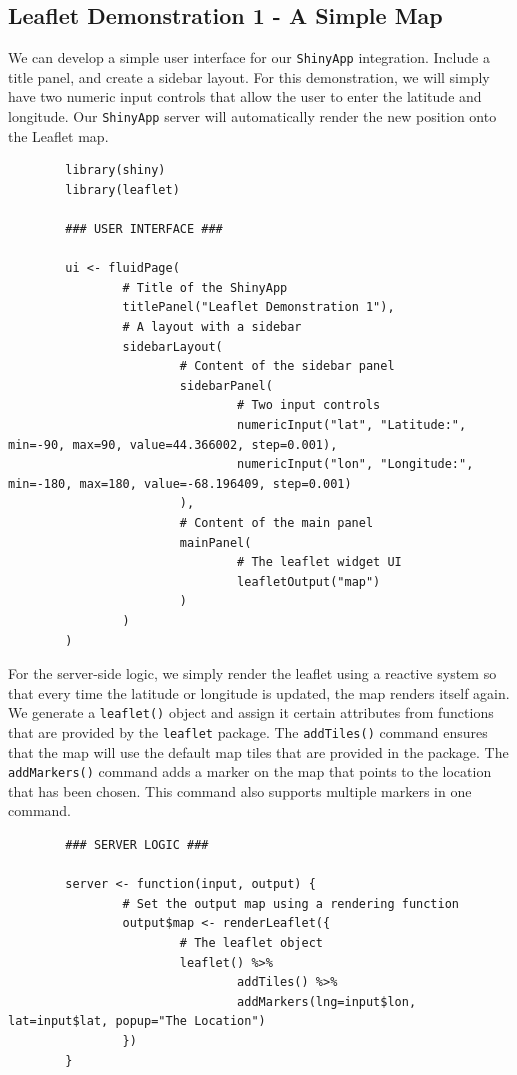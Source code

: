 	\subsection{Leaflet Demonstration 1 - A Simple Map}
	
	We can develop a simple user interface for our \texttt{ShinyApp} integration.
        Include a title panel, and create a sidebar layout.
        For this demonstration, we will simply have two numeric input controls that allow the user to enter the latitude and longitude.
        Our \texttt{ShinyApp} server will automatically render the new position onto the Leaflet map.
	
        \begin{lstlisting}
        library(shiny)
        library(leaflet)
        
        ### USER INTERFACE ###
        
        ui <- fluidPage(
                # Title of the ShinyApp
                titlePanel("Leaflet Demonstration 1"),
                # A layout with a sidebar
                sidebarLayout(
                        # Content of the sidebar panel
                        sidebarPanel(
                                # Two input controls
                                numericInput("lat", "Latitude:", min=-90, max=90, value=44.366002, step=0.001),
                                numericInput("lon", "Longitude:", min=-180, max=180, value=-68.196409, step=0.001)
                        ),
                        # Content of the main panel
                        mainPanel(
                                # The leaflet widget UI
                                leafletOutput("map")
                        )
                )
        )
        \end{lstlisting}

	For the server-side logic, we simply render the leaflet using a reactive system so that every time the latitude or longitude is updated, the map renders itself again. We generate a \texttt{leaflet()} object and assign it certain attributes from functions that are provided by the \texttt{leaflet} package. The \texttt{addTiles()} command ensures that the map will use the default map tiles that are provided in the package. The \texttt{addMarkers()} command adds a marker on the map that points to the location that has been chosen. This command also supports multiple markers in one command.
	
        \begin{lstlisting}
        ### SERVER LOGIC ###
        
        server <- function(input, output) {
                # Set the output map using a rendering function
                output$map <- renderLeaflet({
                        # The leaflet object
                        leaflet() %>%
                                addTiles() %>%
                                addMarkers(lng=input$lon, lat=input$lat, popup="The Location")
                })
        }
        \end{lstlisting}	
	
